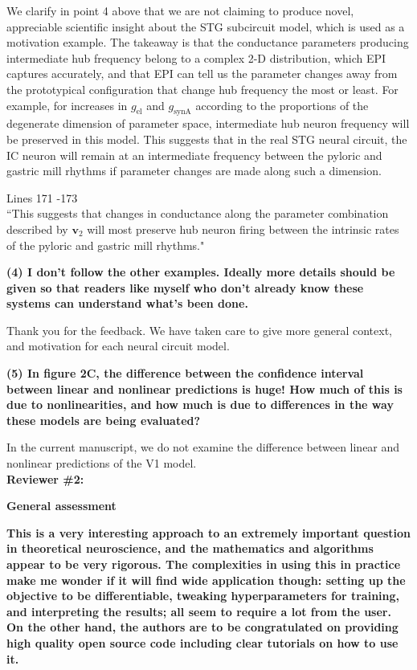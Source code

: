 \documentclass[11pt,a4paper]{article}
\begin{document}
We clarify in point 4 above that we are not claiming to produce novel, appreciable scientific insight about the STG subcircuit model, which is used as a motivation example. The takeaway is that the conductance parameters producing intermediate hub frequency belong to a complex 2-D distribution, which EPI captures accurately, and that EPI can tell us the parameter changes away from the prototypical configuration that change hub frequency the most or least.  For example, for increases in $g_{\text{el}}$ and $g_{\text{synA}}$ according to the proportions of the degenerate dimension of parameter space, intermediate hub neuron frequency will be preserved in this model.  This suggests that in the real STG neural circuit, the IC neuron will remain at an intermediate frequency between the pyloric and gastric mill rhythms if parameter changes are made along such a dimension.

\begin{displayquote}
Lines 171 -173 \\
``This suggests that changes in conductance along the parameter combination described by $\mathbf{v}_2$ will most preserve hub neuron firing between the intrinsic rates of the pyloric and gastric mill rhythms."
\end{displayquote}
 
\textbf{(4) I don't follow the other examples. Ideally more details should be given so that readers like myself who don't already know these systems can understand what's been done. }

Thank you for the feedback.  We have taken care to give more general context, and motivation for each neural circuit model.

\textbf{(5) In figure 2C, the difference between the confidence interval between linear and nonlinear predictions is huge! How much of this is due to nonlinearities, and how much is due to differences in the way these models are being evaluated? }

In the current manuscript, we do not examine the difference between linear and nonlinear predictions of the V1 model. \\

{\Large \textbf{Reviewer \#2: }}

\textbf{General assessment }

\textbf{This is a very interesting approach to an extremely important question in theoretical neuroscience, and the mathematics and algorithms appear to be very rigorous. The complexities in using this in practice make me wonder if it will find wide application though: setting up the objective to be differentiable, tweaking hyperparameters for training, and interpreting the results; all seem to require a lot from the user. On the other hand, the authors are to be congratulated on providing high quality open source code including clear tutorials on how to use it. }
\end{document}
